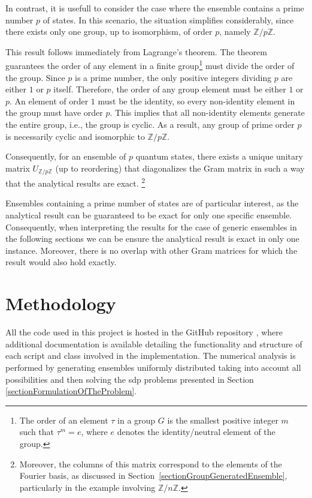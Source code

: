 \documentclass[12pt,letterpaper]{article}
\begin{document}
In contrast, it is usefull to consider the case where the ensemble contains a prime number $p$ of states. In this scenario, the situation simplifies considerably, since there exists only one group, up to isomorphism, of order $p$, namely $\mathbb{Z}/p\mathbb{Z}$.

This result follows immediately from Lagrange's theorem. The theorem guarantees the order of any element in a finite group\footnote{The order of an element $\tau$ in a group $G$ is the smallest positive integer $m$ such that $\tau^m = e$, where $e$ denotes the identity/neutral element of the group.} must divide the order of the group. Since $p$ is a prime number, the only positive integers dividing $p$ are either $1$ or $p$ itself. Therefore, the order of any group element must be either $1$ or $p$. An element of order $1$ must be the identity, so every non-identity element in the group must have order $p$. This implies that all non-identity elements generate the entire group, i.e., the group is cyclic. As a result, any group of prime order $p$ is necessarily cyclic and isomorphic to $\mathbb{Z}/p\mathbb{Z}$.

Consequently, for an ensemble of $p$ quantum states, there exists a unique unitary matrix $U_{\mathbb{Z}/p\mathbb{Z}}$ (up to reordering) that diagonalizes the Gram matrix in such a way that the analytical results are exact. \footnote{Moreover, the columns of this matrix correspond to the elements of the Fourier basis, as discussed in Section~\ref{sectionGroupGeneratedEnsemble}, particularly in the example involving $\mathbb{Z}/n\mathbb{Z}$.}

Ensembles containing a prime number of states are of particular interest, as the analytical result can be guaranteed to be exact for only one specific ensemble. Consequently, when interpreting the results for the case of generic ensembles in the following sections we can be ensure the analytical result is exact in only one instance. Moreover, there is no overlap with other Gram matrices for which the result would also hold exactly.

\newpage
\section{Methodology}\label{sectionMethodology}

All the code used in this project is hosted in the GitHub repository \cite{GitHub}, where additional documentation is available detailing the functionality and structure of each script and class involved in the implementation. The numerical analysis is performed by generating ensembles uniformly distributed taking into account all possibilities and then solving the \gls{sdp} problems presented in Section \ref{sectionFormulationOfTheProblem}.
\end{document}
